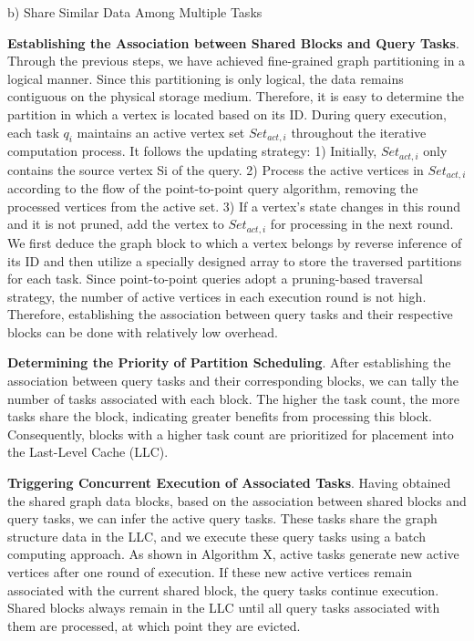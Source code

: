 \documentclass[lettersize,journal]{IEEEtran} %
\begin{document}
b) Share Similar Data Among Multiple Tasks

{\bf{Establishing the Association between Shared Blocks and Query Tasks}}. Through the previous steps, we have achieved fine-grained graph partitioning in a logical manner. Since this partitioning is only logical, the data remains contiguous on the physical storage medium. Therefore, it is easy to determine the partition in which a vertex is located based on its ID. During query execution, each task $q_i$ maintains an active vertex set $Set_{act,i}$ throughout the iterative computation process. It follows the updating strategy: 1) Initially, $Set_{act,i}$ only contains the source vertex Si of the query. 2) Process the active vertices in $Set_{act,i}$ according to the flow of the point-to-point query algorithm, removing the processed vertices from the active set. 3) If a vertex's state changes in this round and it is not pruned, add the vertex to $Set_{act,i}$ for processing in the next round. We first deduce the graph block to which a vertex belongs by reverse inference of its ID and then utilize a specially designed array to store the traversed partitions for each task. Since point-to-point queries adopt a pruning-based traversal strategy, the number of active vertices in each execution round is not high. Therefore, establishing the association between query tasks and their respective blocks can be done with relatively low overhead.

{\bf{Determining the Priority of Partition Scheduling}}. After establishing the association between query tasks and their corresponding blocks, we can tally the number of tasks associated with each block. The higher the task count, the more tasks share the block, indicating greater benefits from processing this block. Consequently, blocks with a higher task count are prioritized for placement into the Last-Level Cache (LLC).

{\bf{Triggering Concurrent Execution of Associated Tasks}}. Having obtained the shared graph data blocks, based on the association between shared blocks and query tasks, we can infer the active query tasks. These tasks share the graph structure data in the LLC, and we execute these query tasks using a batch computing approach. As shown in Algorithm X, active tasks generate new active vertices after one round of execution. If these new active vertices remain associated with the current shared block, the query tasks continue execution. Shared blocks always remain in the LLC until all query tasks associated with them are processed, at which point they are evicted.
\end{document}

